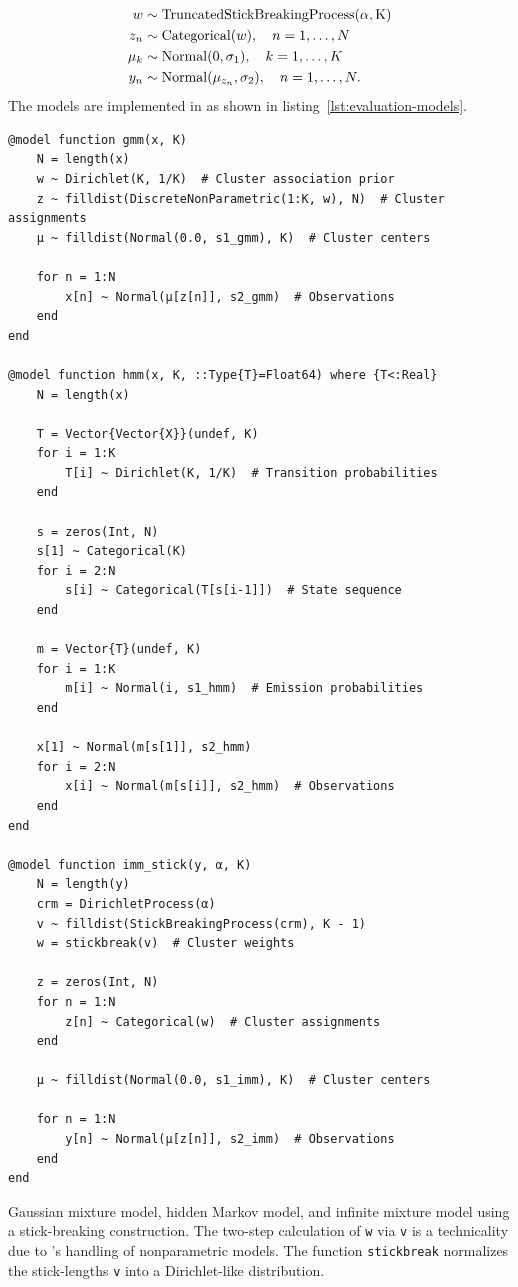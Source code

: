 \begin{equation}
  \label{eq:imm}
  \begin{aligned}
    w &\sim \mathrm{TruncatedStickBreakingProcess(\alpha, K)} \\
    z_{n} &\sim \mathrm{Categorical}(w), \quad n = 1, \ldots, N \\
    \mu_{k} &\sim \mathrm{Normal}(0, \sigma_{1}), \quad k = 1, \ldots, K \\
    y_{n} &\sim \mathrm{Normal}(\mu_{z_{n}}, \sigma_{2}), \quad n = 1, \ldots, N.
  \end{aligned}
\end{equation}
The models are implemented in \dppljl{} as shown in listing~\ref{lst:evaluation-models}.
\begin{lstfloat}[p]
\begin{lstlisting}[style=lstfloat]
@model function gmm(x, K)
    N = length(x)
    w ~ Dirichlet(K, 1/K)  # Cluster association prior
    z ~ filldist(DiscreteNonParametric(1:K, w), N)  # Cluster assignments
    μ ~ filldist(Normal(0.0, s1_gmm), K)  # Cluster centers

    for n = 1:N
        x[n] ~ Normal(μ[z[n]], s2_gmm)  # Observations
    end
end

@model function hmm(x, K, ::Type{T}=Float64) where {T<:Real}
    N = length(x)

    T = Vector{Vector{X}}(undef, K)
    for i = 1:K
        T[i] ~ Dirichlet(K, 1/K)  # Transition probabilities
    end
    
    s = zeros(Int, N)
    s[1] ~ Categorical(K)
    for i = 2:N
        s[i] ~ Categorical(T[s[i-1]])  # State sequence
    end
    
    m = Vector{T}(undef, K)
    for i = 1:K
        m[i] ~ Normal(i, s1_hmm)  # Emission probabilities
    end
    
    x[1] ~ Normal(m[s[1]], s2_hmm)
    for i = 2:N
        x[i] ~ Normal(m[s[i]], s2_hmm)  # Observations
    end
end

@model function imm_stick(y, α, K)
    N = length(y)
    crm = DirichletProcess(α)
    v ~ filldist(StickBreakingProcess(crm), K - 1)
    w = stickbreak(v)  # Cluster weights
    
    z = zeros(Int, N)
    for n = 1:N
        z[n] ~ Categorical(w)  # Cluster assignments
    end

    μ ~ filldist(Normal(0.0, s1_imm), K)  # Cluster centers

    for n = 1:N
        y[n] ~ Normal(μ[z[n]], s2_imm)  # Observations
    end
end
\end{lstlisting}
  \caption{Gaussian mixture model, hidden Markov model, and infinite mixture model using a
    stick-breaking construction.  The two-step calculation of \texttt{w} via \texttt{v} is a
    technicality due to \turingjl{}'s handling of nonparametric models.  The function
    \texttt{stickbreak} normalizes the stick-lengths \texttt{v} into a Dirichlet-like distribution.}
  \label{lst:evaluation-models}
\end{lstfloat}
